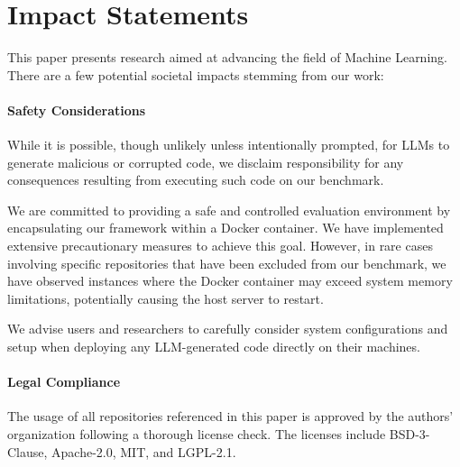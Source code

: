 \section*{Impact Statements}

This paper presents research aimed at advancing the field of Machine Learning. There are a few potential societal impacts stemming from our work:

\paragraph{Safety Considerations}
While it is possible, though unlikely unless intentionally prompted, for LLMs to generate malicious or corrupted code, we disclaim responsibility for any consequences resulting from executing such code on our benchmark. 

We are committed to providing a safe and controlled evaluation environment by encapsulating our framework within a Docker container. We have implemented extensive precautionary measures to achieve this goal. However, in rare cases involving specific repositories that have been excluded from our benchmark, we have observed instances where the Docker container may exceed system memory limitations, potentially causing the host server to restart.

We advise users and researchers to carefully consider system configurations and setup when deploying any LLM-generated code directly on their machines.

\paragraph{Legal Compliance}
The usage of all repositories referenced in this paper is approved by the authors' organization following a thorough license check. The licenses include BSD-3-Clause, Apache-2.0, MIT, and LGPL-2.1.